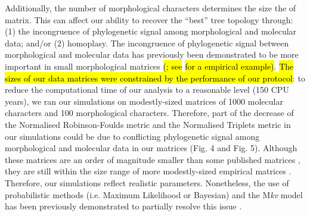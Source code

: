 \documentclass[12pt,letterpaper]{article}
\begin{document}
Additionally, the number of morphological characters determines the size the of matrix.
This can affect our ability to recover the ``best'' tree topology through: (1) the incongruence of phylogenetic signal among morphological and molecular data; and/or (2) homoplasy.
The incongruence of phylogenetic signal between morphological and molecular data has previously been demonstrated to be more important in small morphological matrices \hl{(}\citealt{bremer1992phylogeny,patterson1993congruence}\hl{; see }\citealt{masters2002lack}\hl{ for a empirical example)}.
\hl{The sizes of our data matrices were constrained by the performance of our protocol}: to reduce the computational time of our analysis to a reasonable level (150 CPU years), we ran our simulations on modestly-sized matrices of 1000 molecular characters and 100 morphological characters.
Therefore, part of the decrease of the Normalised Robinson-Foulds metric and the Normalised Triplets metric in our simulations could be due to conflicting phylogenetic signal among morphological and molecular data in our matrices (Fig. 4 and Fig. 5).
Although these matrices are an order of magnitude smaller than some published matrices \citep[e.g.][]{springermacroevolutionary2012,nithe2013}, they are still within the size range of more modestly-sized empirical matrices \citep[e.g.][]{kellymolecular2014, sallam2011craniodental}.
Therefore, our simulations reflect realistic parameters.
Nonetheless, the use of probabilistic methods (i.e. Maximum Likelihood or Bayesian) and the M\textit{kv} model \citep{lewisa2001} has been previously demonstrated to partially resolve this issue \citep{wrightbayesian2014}.
\end{document}

